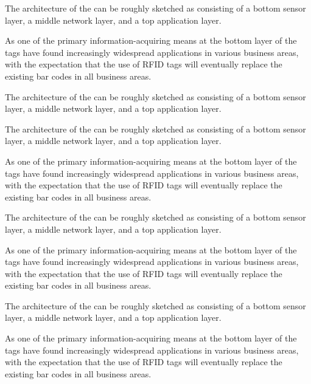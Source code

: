 \documentclass[10pt]{ietbook}
\begin{document}
The architecture of the can be roughly sketched
as consisting of a bottom sensor layer, a middle network layer, and a
top application layer. 
\begin{property}
{As one of the primary information-acquiring means at the bottom layer of the
tags have found increasingly widespread applications in various business
areas, with the expectation that the use of RFID tags will eventually
replace the existing bar codes in all business areas.}
\end{property}
The architecture of the can be roughly sketched
as consisting of a bottom sensor layer, a middle network layer, and a
top application layer.


The architecture of the can be roughly sketched
as consisting of a bottom sensor layer, a middle network layer, and a
top application layer.
\begin{example}
{As one of the primary information-acquiring means at the bottom layer of the
tags have found increasingly widespread applications in various business
areas, with the expectation that the use of RFID tags will eventually
replace the existing bar codes in all business areas.}
\end{example}
The architecture of the can be roughly sketched
as consisting of a bottom sensor layer, a middle network layer, and a
top application layer.

As one of the primary information-acquiring means at the bottom layer of the
tags have found increasingly widespread applications in various business
areas, with the expectation that the use of RFID tags will eventually
replace the existing bar codes in all business areas.
\begin{definition}
The architecture of the can be roughly sketched
as consisting of a bottom sensor layer, a middle network layer, and a
top application layer.
\end{definition}
As one of the primary information-acquiring means at the bottom layer of the
tags have found increasingly widespread applications in various business
areas, with the expectation that the use of RFID tags will eventually
replace the existing bar codes in all business areas.
\end{document}
